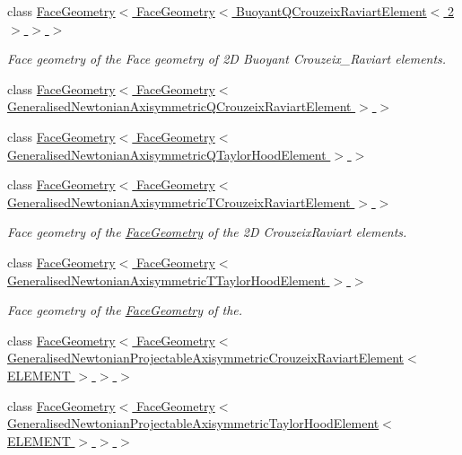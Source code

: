 \begin{DoxyCompactItemize}
class \hyperlink{classoomph_1_1FaceGeometry_3_01FaceGeometry_3_01BuoyantQCrouzeixRaviartElement_3_012_01_4_01_4_01_4}{Face\+Geometry$<$ Face\+Geometry$<$ Buoyant\+Q\+Crouzeix\+Raviart\+Element$<$ 2 $>$ $>$ $>$}
\begin{DoxyCompactList}\small\item\em Face geometry of the Face geometry of 2D Buoyant Crouzeix\+\_\+\+Raviart elements. \end{DoxyCompactList}\item 
class \hyperlink{classoomph_1_1FaceGeometry_3_01FaceGeometry_3_01GeneralisedNewtonianAxisymmetricQCrouzeixRaviartElement_01_4_01_4}{Face\+Geometry$<$ Face\+Geometry$<$ Generalised\+Newtonian\+Axisymmetric\+Q\+Crouzeix\+Raviart\+Element $>$ $>$}
\item 
class \hyperlink{classoomph_1_1FaceGeometry_3_01FaceGeometry_3_01GeneralisedNewtonianAxisymmetricQTaylorHoodElement_01_4_01_4}{Face\+Geometry$<$ Face\+Geometry$<$ Generalised\+Newtonian\+Axisymmetric\+Q\+Taylor\+Hood\+Element $>$ $>$}
\item 
class \hyperlink{classoomph_1_1FaceGeometry_3_01FaceGeometry_3_01GeneralisedNewtonianAxisymmetricTCrouzeixRaviartElement_01_4_01_4}{Face\+Geometry$<$ Face\+Geometry$<$ Generalised\+Newtonian\+Axisymmetric\+T\+Crouzeix\+Raviart\+Element $>$ $>$}
\begin{DoxyCompactList}\small\item\em Face geometry of the \hyperlink{classoomph_1_1FaceGeometry}{Face\+Geometry} of the 2D Crouzeix\+Raviart elements. \end{DoxyCompactList}\item 
class \hyperlink{classoomph_1_1FaceGeometry_3_01FaceGeometry_3_01GeneralisedNewtonianAxisymmetricTTaylorHoodElement_01_4_01_4}{Face\+Geometry$<$ Face\+Geometry$<$ Generalised\+Newtonian\+Axisymmetric\+T\+Taylor\+Hood\+Element $>$ $>$}
\begin{DoxyCompactList}\small\item\em Face geometry of the \hyperlink{classoomph_1_1FaceGeometry}{Face\+Geometry} of the. \end{DoxyCompactList}\item 
class \hyperlink{classoomph_1_1FaceGeometry_3_01FaceGeometry_3_01GeneralisedNewtonianProjectableAxisymmetricCrouz71c704176cfe71b6b29a678d04307a69}{Face\+Geometry$<$ Face\+Geometry$<$ Generalised\+Newtonian\+Projectable\+Axisymmetric\+Crouzeix\+Raviart\+Element$<$ E\+L\+E\+M\+E\+N\+T $>$ $>$ $>$}
\item 
class \hyperlink{classoomph_1_1FaceGeometry_3_01FaceGeometry_3_01GeneralisedNewtonianProjectableAxisymmetricTaylodd4d51505b2586f1026bb874336afc4e}{Face\+Geometry$<$ Face\+Geometry$<$ Generalised\+Newtonian\+Projectable\+Axisymmetric\+Taylor\+Hood\+Element$<$ E\+L\+E\+M\+E\+N\+T $>$ $>$ $>$}

\end{DoxyCompactItemize}
